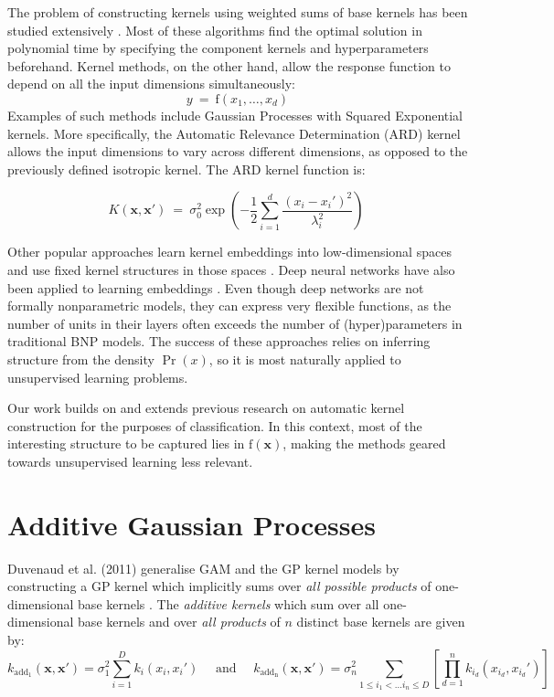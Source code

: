 \documentclass[a4paper,12pt ]{report}
\renewcommand{\GP}{{GP}}
\begin{document}
The problem of constructing kernels using weighted sums of base kernels has been studied extensively \cite{christoudias2009bayesian}. Most of these algorithms find the optimal solution in polynomial time by specifying the component kernels and hyperparameters beforehand.
Kernel methods, on the other hand, allow the response function to depend on all the input dimensions simultaneously: \begin{equation*} y ~=~ \mathrm{f}(x_1, \ldots, x_d)\end{equation*}
Examples of such methods include Gaussian Processes with Squared Exponential kernels. More specifically, the {\SE} Automatic Relevance Determination (ARD) kernel allows the input dimensions to vary across different dimensions, as opposed to the previously defined isotropic kernel. The {\SE} ARD kernel function is:

\begin{equation*} K(\mathbf{x}, \mathbf{x'}) ~=~ \sigma_0^2  \exp \left(  - \frac{1}{2} \sum_{i=1}^{d}\frac{({x_i}-{x_{i}'})^2}{{ {\lambda_{i}^2}}} \right) ~ \end{equation*}

Other popular approaches learn kernel embeddings into low-dimensional spaces and use fixed kernel structures in those spaces \cite{lawrence2005probabilistic}. Deep neural networks have also been applied to learning embeddings \cite{salakhutdinov2008using}. Even though deep networks are not formally nonparametric models, they can express very flexible functions, as the number of units in their layers often exceeds the number of (hyper)parameters in traditional BNP models. The success of these approaches relies on inferring structure from the density $\Pr(x)$, so it is most naturally applied to unsupervised learning problems.

Our work builds on and extends previous research on automatic kernel construction for the purposes of classification. In this context, most of the interesting structure to be captured lies in $\mathrm{f(\mathbf{x})}$, making the methods geared towards unsupervised learning less relevant.

\section{Additive Gaussian Processes}

Duvenaud et al. (2011) generalise GAM and the {\GP}  {\SE} kernel models by constructing a {\GP} kernel which implicitly sums over \emph{all possible products} of one-dimensional base {\SE} kernels \cite{duvenaud2011additive11}. The \emph{additive kernels} which sum over all one-dimensional base kernels and over \emph{all products} of $n$ distinct base kernels are given by:
\begin{equation*} k_{\mathrm{{add}_1}}(\mathbf{x, x'}) = \sigma_{1}^2  \sum_{i=1}^{D}{k_{i}(x_{i}, x_{i}')}  \mbox{~~~~and~~~~}  k_{\mathrm{{add}_n}}(\mathbf{x, x'}) = \sigma_{n}^2  \sum_{1 \leq i_1 < \ldots i_n \leq D}{ \left[ \prod_{d=1}^{n}{k_{i_{d}}(x_{i_d}, x_{i_d}')} \right] }  \end{equation*}
\end{document}
